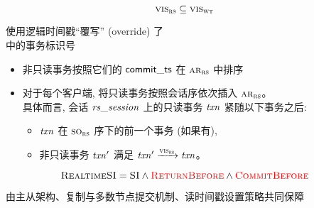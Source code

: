 \begin{frame}{}
  \begin{lemma}
	\[
	  \textsc{vis}_{\textsc{rs}} \subseteq \textsc{vis}_{\textsc{wt}}
	\]
  \end{lemma}

  \vspace{0.50cm}
  \begin{center}
	\rsalg{} 使用逻辑时间戳``覆写'' (override) 了 \\[5pt]
	\wtalg{} 中的事务标识号
  \end{center}
\end{frame}

\begin{frame}{}
  \begin{definition}
	\begin{itemize}
	  \setlength{\itemsep}{10pt}
	  \item 非只读事务按照它们的 ${\sf commit\_ts}$ 在 $\textsc{ar}_{\textsc{rs}}$ 中排序
	  \item 对于每个客户端, 将只读事务按照会话序依次插入 $\textsc{ar}_{\textsc{rs}}$。\\[5pt]
	    具体而言, 会话 $\mathit{rs\_session}$ 上的只读事务 $\mathit{txn}$ 紧随以下事务之后: \\[5pt]
	    \begin{itemize}
		  \setlength{\itemsep}{5pt}
		  \item $\mathit{txn}$ 在 $\textsc{so}_{\textsc{rs}}$ 序下的前一个事务 (如果有),
		  \item 非只读事务 $\mathit{txn}'$ 满足 $\mathit{txn}' \xrightarrow{\textsc{vis}_{\textsc{rs}}} \mathit{txn}$。
		\end{itemize}
	\end{itemize}
  \end{definition}
\end{frame}

\begin{frame}{}

  \[
	\textsc{RealtimeSI} = \textsc{SI} \land \textcolor{red}{\textsc{ReturnBefore}} \land \textcolor{red}{\textsc{CommitBefore}}
  \]

  \begin{center}
	由主从架构、复制与多数节点提交机制、读时间戳设置策略共同保障
  \end{center}
\end{frame}
